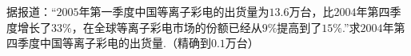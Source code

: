 据报道：“$2005$年第一季度中国等离子彩电的出货量为$13.6$万台，比$2004$年第四季度增长了$33\%$，在全球等离子彩电市场的份额已经从$9\%$提高到了$15\%$.”求$2004$年第四季度中国等离子彩电的出货量.（精确到$0.1$万台）